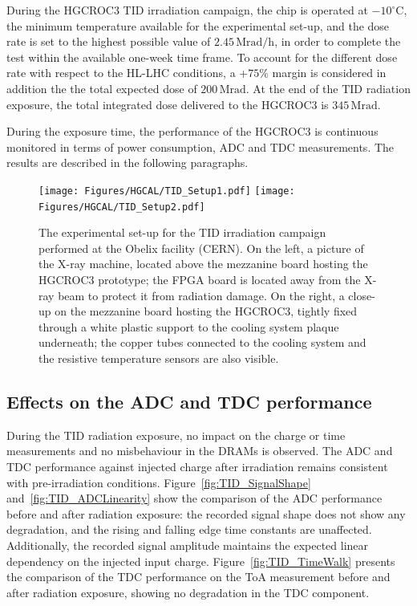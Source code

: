 During the HGCROC3 TID irradiation campaign, the chip is operated at $-10^{\circ}$C, the minimum temperature available for the experimental set-up, and the dose rate is set to the highest possible value of $2.45\,\textrm{Mrad/h}$, in order to complete the test within the available one-week time frame. 
To account for the different dose rate with respect to the HL-LHC conditions, a +$75\%$ margin is considered in addition the the total expected dose of $200\,\textrm{Mrad}$.
At the end of the TID radiation exposure, the total integrated dose delivered to the HGCROC3 is $345\,\textrm{Mrad}$.

\bigbreak

During the exposure time, the performance of the HGCROC3 is continuous monitored in terms of power consumption, ADC and TDC measurements. The results are described in the following paragraphs. 

\begin{figure}
    \centering
    \texttt{[image: Figures/HGCAL/TID\_Setup1.pdf]}
    \texttt{[image: Figures/HGCAL/TID\_Setup2.pdf]}
    \caption{The experimental set-up for the TID irradiation campaign performed at the Obelix facility (CERN). On the left, a picture of the X-ray machine, located above the mezzanine board hosting the HGCROC3 prototype; the FPGA board is located away from the X-ray beam to protect it from radiation damage. On the right, a close-up on the mezzanine board hosting the HGCROC3, tightly fixed through a white plastic support to the cooling system plaque underneath; the copper tubes connected to the cooling system and the resistive temperature sensors are also visible.}
    \label{fig:TID_Setup}
\end{figure}

\subsection{Effects on the ADC and TDC performance}
\label{subsec:ADC and TDC performance}

During the TID radiation exposure, no impact on the charge or time measurements and no misbehaviour in the DRAMs is observed. The ADC and TDC performance against injected charge after irradiation remains consistent with pre-irradiation conditions.
Figure~\ref{fig:TID_SignalShape} and~\ref{fig:TID_ADCLinearity} show the comparison of the ADC performance before and after radiation exposure: the recorded signal shape does not show any degradation, and the rising and falling edge time constants are unaffected. Additionally, the recorded signal amplitude maintains the expected linear dependency on the injected input charge.
Figure~\ref{fig:TID_TimeWalk} presents the comparison of the TDC performance on the ToA measurement before and after radiation exposure, showing no degradation in the TDC component.

